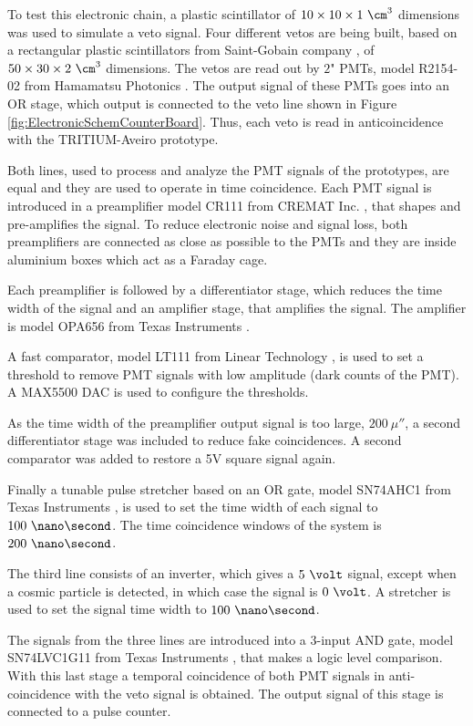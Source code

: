\begin{enumerate}
To test this electronic chain, a plastic scintillator of $10 \times 10 \times 1~\cm^3$ dimensions was used to simulate a veto signal. Four different vetos are being built, based on a rectangular plastic scintillators from Saint-Gobain company \cite{VetoAveiro}, of $50\times 30 \times 2~\cm^3$ dimensions. The vetos are read out by $2$" PMTs, model R2154-02 from Hamamatsu Photonics \cite{DataSheetPMTsAveiro}. The output signal of these PMTs goes into an OR stage, which output is connected to the veto line shown in Figure \ref{fig:ElectronicSchemCounterBoard}. Thus, each veto is read in anticoincidence with the TRITIUM-Aveiro prototype.

Both lines, used to process and analyze the PMT signals of the prototypes, are equal and they are used to operate in time coincidence. Each PMT signal is introduced in a preamplifier model CR111 from CREMAT Inc. \cite{CREMATPreAmplifierDataSheet}, that shapes and pre-amplifies the signal. To reduce electronic noise and signal loss, both preamplifiers are connected as close as possible to the PMTs and they are inside aluminium boxes which act as a Faraday cage.

Each preamplifier is followed by a differentiator stage, which reduces the time width of the signal and an amplifier stage, that amplifies the signal. The amplifier is model OPA656 from Texas Instruments \cite{OPA656}. 

A fast comparator, model LT111 from Linear Technology \cite{LT111}, is used to set a threshold to remove PMT signals with low amplitude (dark counts of the PMT). A MAX5500 DAC is used to configure the thresholds.

As the time width of the preamplifier output signal is too large, $200~\mu\second$, a second differentiator stage was included to reduce fake coincidences. A second comparator was added to restore a 5V square signal again.

Finally a tunable pulse stretcher based on an OR gate, model SN74AHC1 from Texas Instruments \cite{Stretcher}, is used to set the time width of each signal to $100~\nano\second$. The time coincidence windows of the system is $200~\nano\second$.

The third line consists of an inverter, which gives a $5~\volt$ signal, except when a cosmic particle is detected, in which case the signal is $0~\volt$. A stretcher is used to set the signal time width to $100~\nano\second$.

The signals from the three lines are introduced into a 3-input AND gate, model SN74LVC1G11 from Texas Instruments \cite{ANDGate}, that makes a logic level comparison. With this last stage a temporal coincidence of both PMT signals in anti-coincidence with the veto signal is obtained. The output signal of this stage is connected to a pulse counter. 


\end{enumerate}

